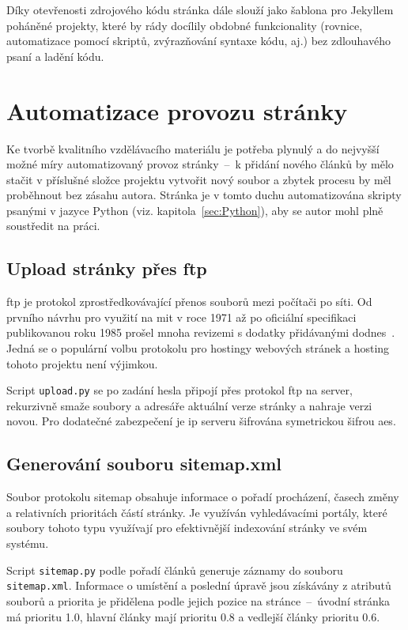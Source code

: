 \documentclass[a4paper, 12pt, twoside]{article}
\begin{document}
  Díky otevřenosti zdrojového kódu stránka dále slouží jako šablona pro Jekyllem poháněné projekty, které by rády docílily obdobné funkcionality (rovnice, automatizace pomocí skriptů, zvýrazňování syntaxe kódu, aj.) bez zdlouhavého psaní a ladění kódu.


  \section{Automatizace provozu stránky} \label{sec:Automatizace provozu stránky}
  Ke tvorbě kvalitního vzdělávacího materiálu je potřeba plynulý a do nejvyšší možné míry automatizovaný provoz stránky~--~k přidání nového článků by mělo stačit v příslušné složce projektu vytvořit nový soubor a zbytek procesu by měl proběhnout bez zásahu autora. Stránka je v tomto duchu automatizována skripty psanými v jazyce Python (viz. kapitola~\ref{sec:Python}), aby se autor mohl plně soustředit na práci.


  \subsection{Upload stránky přes \acrshort{ftp}}
  \gls{ftp} je protokol zprostředkovávající přenos souborů mezi počítači po síti. Od prvního návrhu pro využití na \gls{mit} v roce 1971 až po oficiální specifikaci publikovanou roku 1985 prošel mnoha revizemi s dodatky přidávanými dodnes~\cite{ftp-specification}. Jedná se o populární volbu protokolu pro hostingy webových stránek a hosting tohoto projektu není výjimkou.

  Script \texttt{upload.py} se po zadání hesla připojí přes protokol \gls{ftp} na server, rekurzivně smaže soubory a adresáře aktuální verze stránky a nahraje verzi novou. Pro dodatečné zabezpečení je \gls{ip} serveru šifrována symetrickou šifrou \gls{aes}.


  \subsection{Generování souboru sitemap.xml}
  Soubor protokolu sitemap obsahuje informace o pořadí procházení, časech změny a relativních prioritách částí stránky. Je využíván vyhledávacími portály, které soubory tohoto typu využívají pro efektivnější indexování stránky ve svém systému.

  Script \texttt{sitemap.py} podle pořadí článků generuje záznamy do souboru \texttt{sitemap.xml}. Informace o umístění a poslední úpravě jsou získávány z atributů souborů a priorita je přidělena podle jejich pozice na stránce~--~úvodní stránka má prioritu \num{1.0}, hlavní články mají prioritu \num{0.8} a vedlejší články prioritu \num{0.6}.
\end{document}
